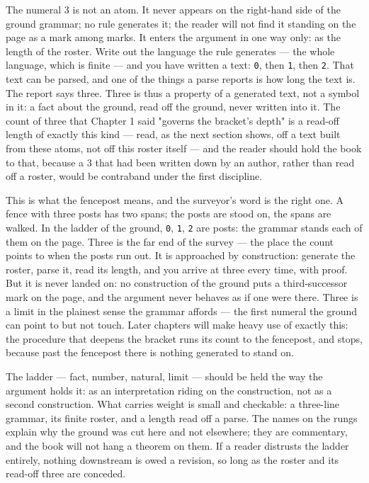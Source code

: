 The numeral 3 is not an atom. It never appears on the right-hand side of the ground
grammar; no rule generates it; the reader will not find it standing on the page as a
mark among marks. It enters the argument in one way only: as the length of the roster.
Write out the language the rule generates --- the whole language, which is finite ---
and you have written a text: \texttt{0}, then \texttt{1}, then \texttt{2}. That text
can be parsed, and one of the things a parse reports is how long the text is. The
report says three. Three is thus a property of a generated text, not a symbol in it: a
fact about the ground, read off the ground, never written into it. The count of three
that Chapter 1 said "governs the bracket's depth" is a read-off length of exactly this
kind --- read, as the next section shows, off a text built from these atoms, not off
this roster itself --- and the reader should hold the book to that, because a 3 that had
been written down by an author, rather than read off a roster, would be contraband under
the first discipline.

This is what the fencepost means, and the surveyor's word is the right one. A fence
with three posts has two spans; the posts are stood on, the spans are walked. In the
ladder of the ground, \texttt{0}, \texttt{1}, \texttt{2} are posts: the grammar stands
each of them on the page. Three is the far end of the survey --- the place the count
points to when the posts run out. It is approached by construction: generate the
roster, parse it, read its length, and you arrive at three every time, with proof. But
it is never landed on: no construction of the ground puts a third-successor mark on the
page, and the argument never behaves as if one were there. Three is a limit in the
plainest sense the grammar affords --- the first numeral the ground can point to but
not touch. Later chapters will make heavy use of exactly this: the procedure that
deepens the bracket runs its count to the fencepost, and stops, because past the
fencepost there is nothing generated to stand on.

The ladder --- fact, number, natural, limit --- should be held the way the argument
holds it: as an interpretation riding on the construction, not as a second
construction. What carries weight is small and checkable: a three-line grammar, its
finite roster, and a length read off a parse. The names on the rungs explain why the
ground was cut here and not elsewhere; they are commentary, and the book will not hang
a theorem on them. If a reader distrusts the ladder entirely, nothing downstream is
owed a revision, so long as the roster and its read-off three are conceded.

